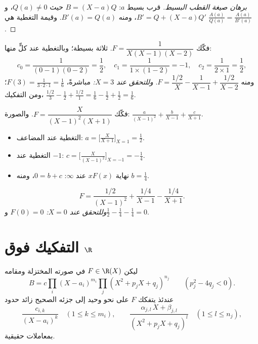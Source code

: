 \begin{proof}[برهان صيغة القطب البسيط]
قرب  بسيط $a$: $B = (X - a) Q$ حيث $Q(a) \neq 0$، و$B' =
Q + (X - a) Q'$، ومنه $B'(a) = Q(a)$. وقيمة التغطية هي
$\frac{A(a)}{Q(a)} = \frac{A(a)}{B'(a)}$.
\end{proof}

\begin{example}\label{ex:b1:fractions:simple}
فكّك $F = \dfrac{1}{X(X-1)(X-2)}$. ثلاثة  بسيطة؛ وبالتغطية
عند كلٍّ منها:
\[
c_0 = \frac{1}{(0-1)(0-2)} = \frac12,
\quad
c_1 = \frac{1}{1 \times (1 - 2)} = -1,
\quad
c_2 = \frac{1}{2 \times 1} = \frac12,
\]
ومنه $F = \dfrac{1/2}{X} - \dfrac{1}{X-1} + \dfrac{1/2}{X-2}$.
\emph{وللتحقق عند $X = 3$:} مباشرةً، $F(3) = \frac{1}{3\cdot2\cdot1} =
\frac16$؛ ومن التفكيك، $\frac{1/2}{3} - \frac{1}{2} +
\frac{1/2}{1} = \frac16 - \frac12 + \frac12 = \frac16$.
\end{example}

\begin{example}\label{ex:b1:fractions:multiple}
فكّك $F = \dfrac{X}{(X-1)^2 (X+1)}$. والصورة:
$\frac{a}{(X-1)^2} + \frac{b}{X-1} + \frac{c}{X+1}$.
\begin{itemize}
  \item التغطية عند  المضاعف: $a = \bigl[\frac{X}{X+1}\bigr]_{X=1}
        = \frac12$.
  \item التغطية عند $-1$: $c = \bigl[\frac{X}{(X-1)^2}\bigr]_{X=-1} =
        -\frac14$.
  \item نهاية $xF(x)$ عند $\infty$: $0 = b + c$، ومنه $b = \frac14$.
\end{itemize}
\[
F = \frac{1/2}{(X-1)^2} + \frac{1/4}{X-1} - \frac{1/4}{X+1} .
\]
\emph{وللتحقق عند $X = 0$:} $F(0) = 0$ و$\frac12 - \frac14 - \frac14
= 0$.
\end{example}

\section{التفكيك فوق $\R$}

\begin{theorem}\label{thm:b1:fractions:real}
ليكن $F \in \R(X)$ في صورته المختزلة ومقامه
\[
B = c \prod_i (X - a_i)^{m_i} \prod_j (X^2 + p_j X + q_j)^{n_j}
\qquad (p_j^2 - 4q_j < 0).
\]
عندئذ يتفكك $F$ على نحو وحيد إلى جزئه الصحيح زائد حدود
\[
\frac{c_{i,k}}{(X - a_i)^k} \quad (1 \leq k \leq m_i),
\qquad
\frac{\alpha_{j,l}\, X + \beta_{j,l}}{(X^2 + p_j X + q_j)^{l}}
\quad (1 \leq l \leq n_j),
\]
بمعاملات حقيقية.
\end{theorem}

